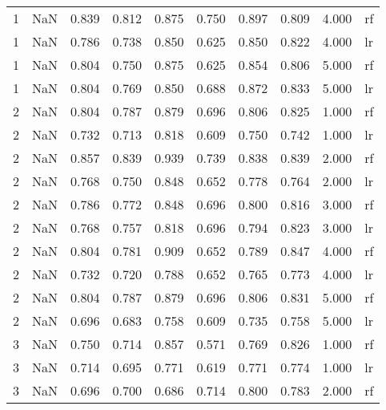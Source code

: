 \begin{tabular}{lrrrrrrrrl}
   1 &               NaN & 0.839 &  0.812 &        0.875 &        0.750 & 0.897 & 0.809 &        4.000 &    rf \\
   1 &               NaN & 0.786 &  0.738 &        0.850 &        0.625 & 0.850 & 0.822 &        4.000 &    lr \\
   1 &               NaN & 0.804 &  0.750 &        0.875 &        0.625 & 0.854 & 0.806 &        5.000 &    rf \\
   1 &               NaN & 0.804 &  0.769 &        0.850 &        0.688 & 0.872 & 0.833 &        5.000 &    lr \\
   2 &               NaN & 0.804 &  0.787 &        0.879 &        0.696 & 0.806 & 0.825 &        1.000 &    rf \\
   2 &               NaN & 0.732 &  0.713 &        0.818 &        0.609 & 0.750 & 0.742 &        1.000 &    lr \\
   2 &               NaN & 0.857 &  0.839 &        0.939 &        0.739 & 0.838 & 0.839 &        2.000 &    rf \\
   2 &               NaN & 0.768 &  0.750 &        0.848 &        0.652 & 0.778 & 0.764 &        2.000 &    lr \\
   2 &               NaN & 0.786 &  0.772 &        0.848 &        0.696 & 0.800 & 0.816 &        3.000 &    rf \\
   2 &               NaN & 0.768 &  0.757 &        0.818 &        0.696 & 0.794 & 0.823 &        3.000 &    lr \\
   2 &               NaN & 0.804 &  0.781 &        0.909 &        0.652 & 0.789 & 0.847 &        4.000 &    rf \\
   2 &               NaN & 0.732 &  0.720 &        0.788 &        0.652 & 0.765 & 0.773 &        4.000 &    lr \\
   2 &               NaN & 0.804 &  0.787 &        0.879 &        0.696 & 0.806 & 0.831 &        5.000 &    rf \\
   2 &               NaN & 0.696 &  0.683 &        0.758 &        0.609 & 0.735 & 0.758 &        5.000 &    lr \\
   3 &               NaN & 0.750 &  0.714 &        0.857 &        0.571 & 0.769 & 0.826 &        1.000 &    rf \\
   3 &               NaN & 0.714 &  0.695 &        0.771 &        0.619 & 0.771 & 0.774 &        1.000 &    lr \\
   3 &               NaN & 0.696 &  0.700 &        0.686 &        0.714 & 0.800 & 0.783 &        2.000 &    rf \\

\end{tabular}
